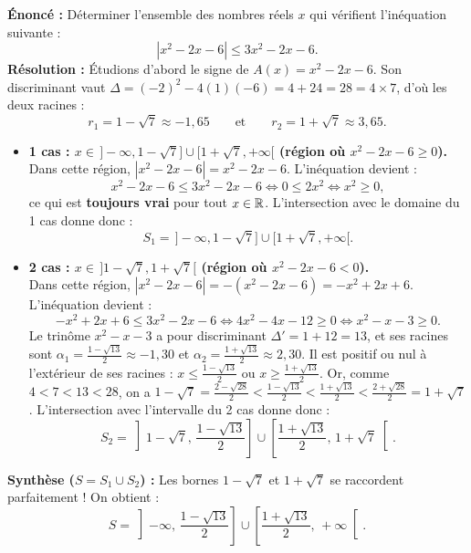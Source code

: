 \begin{exemple}
\textbf{Énoncé :} Déterminer l'ensemble des nombres réels $x$ qui vérifient l'inéquation suivante :
\[
    |x^2 - 2x - 6| \le 3x^2 - 2x - 6.
\]
\textbf{Résolution :} Étudions d'abord le signe de $A(x) = x^2 - 2x - 6$. Son discriminant vaut $\Delta = (-2)^2 - 4(1)(-6) = 4 + 24 = 28 = 4 \times 7$, d'où les deux racines :
\[
    r_1 = 1 - \sqrt{7} \approx -1,65 \qquad \text{et} \qquad r_2 = 1 + \sqrt{7} \approx 3,65.
\]
\begin{itemize}
    \item \textbf{1\ier{} cas : $x \in \,]-\infty, 1 - \sqrt{7}] \cup [1 + \sqrt{7}, +\infty[$ (région où $x^2 - 2x - 6 \ge 0$).}\\
    Dans cette région, $|x^2 - 2x - 6| = x^2 - 2x - 6$. L'inéquation devient :
    \[
        x^2 - 2x - 6 \le 3x^2 - 2x - 6 \iff 0 \le 2x^2 \iff x^2 \ge 0,
    \]
    ce qui est \textbf{toujours vrai} pour tout $x \in \mathbb{R}$. L'intersection avec le domaine du 1\ier{} cas donne donc :
    \[
        S_1 = \,]-\infty, 1 - \sqrt{7}] \cup [1 + \sqrt{7}, +\infty[.
    \]
    \item \textbf{2\ieme{} cas : $x \in \,]1 - \sqrt{7}, 1 + \sqrt{7}[$ (région où $x^2 - 2x - 6 < 0$).}\\
    Dans cette région, $|x^2 - 2x - 6| = -(x^2 - 2x - 6) = -x^2 + 2x + 6$. L'inéquation devient :
    \[
        -x^2 + 2x + 6 \le 3x^2 - 2x - 6 \iff 4x^2 - 4x - 12 \ge 0 \iff x^2 - x - 3 \ge 0.
    \]
    Le trinôme $x^2 - x - 3$ a pour discriminant $\Delta' = 1 + 12 = 13$, et ses racines sont $\alpha_1 = \frac{1 - \sqrt{13}}{2} \approx -1,30$ et $\alpha_2 = \frac{1 + \sqrt{13}}{2} \approx 2,30$. Il est positif ou nul à l'extérieur de ses racines : $x \le \frac{1-\sqrt{13}}{2}$ ou $x \ge \frac{1+\sqrt{13}}{2}$.
    Or, comme $4 < 7 < 13 < 28$, on a $1 - \sqrt{7} = \frac{2 - \sqrt{28}}{2} < \frac{1 - \sqrt{13}}{2} < \frac{1 + \sqrt{13}}{2} < \frac{2 + \sqrt{28}}{2} = 1 + \sqrt{7}$.
    L'intersection avec l'intervalle du 2\ieme{} cas donne donc :
    \[
        S_2 = \left]1 - \sqrt{7},\, \frac{1 - \sqrt{13}}{2}\right] \cup \left[\frac{1 + \sqrt{13}}{2},\, 1 + \sqrt{7}\right[.
    \]
\end{itemize}
\textbf{Synthèse ($S = S_1 \cup S_2$) :} Les bornes $1 - \sqrt{7}$ et $1 + \sqrt{7}$ se raccordent parfaitement ! On obtient :
\[
    \boxed{S = \left]-\infty,\, \frac{1 - \sqrt{13}}{2}\right] \cup \left[\frac{1 + \sqrt{13}}{2},\, +\infty\right[}.
\]
\end{exemple}

